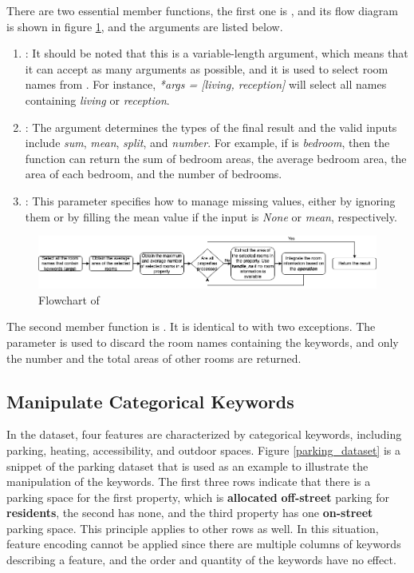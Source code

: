 \documentclass[12pt,twoside]{report}
\begin{document}
There are two essential member functions, the first one is , and its flow diagram is shown in figure \ref{extract_room_get_rooms}, and the arguments are listed below. 
\begin{enumerate}
	\item {}: It should be noted that this is a variable-length argument, which means that it can accept as many arguments as possible, and it is used to select room names from . For instance, \textit{*args = [living, reception]} will select all names containing \textit{living} or \textit{reception}. 
	\item {}: The argument determines the types of the final result and the valid inputs include \textit{sum}, \textit{mean}, \textit{split}, and \textit{number}. For example, if  is \textit{bedroom}, then the function can return the sum of bedroom areas, the average bedroom area, the area of each bedroom, and the number of bedrooms. 
	\item {}: This parameter specifies how to manage missing values, either by ignoring them or by filling the mean value if the input is \textit{None} or \textit{mean}, respectively. 
\end{enumerate} 

\begin{figure}[!htbp]
	\centering
	\includegraphics[width=\linewidth]{extract_room_get_rooms}
	\caption{Flowchart of }
	\label{extract_room_get_rooms}
\end{figure}

The second member function is . It is identical to  with two exceptions. The parameter  is used to discard the room names containing the keywords, and only the number and the total areas of other rooms are returned. 

\subsection{Manipulate Categorical Keywords}
In the dataset, four features are characterized by categorical keywords, including parking, heating, accessibility, and outdoor spaces. Figure \ref{parking_dataset} is a snippet of the parking dataset that is used as an example to illustrate the manipulation of the keywords. The first three rows indicate that there is a parking space for the first property, which is \textbf{allocated} \textbf{off-street} parking for \textbf{residents}, the second has none, and the third property has one \textbf{on-street} parking space. This principle applies to other rows as well. In this situation, feature encoding cannot be applied since there are multiple columns of keywords describing a feature, and the order and quantity of the keywords have no effect.
\\
\end{document}
